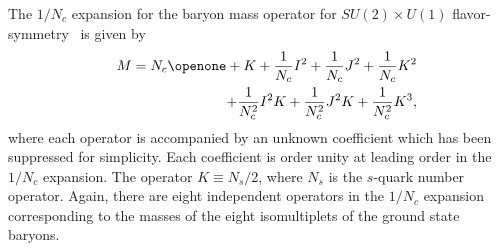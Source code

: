 \documentclass[twocolumn,nofootinbib,prd,aps,superscriptaddress,tightenlines]{revtex4}
\def\N{N_c}
\begin{document}
The $1/N_c$ expansion for the baryon mass operator for $SU(2) \times U(1)$ flavor-symmetry~\cite{djm1} is given by
\begin{eqnarray}\label{su2u1}
&&M = \N \openone + K + {1 \over \N} I^2 + {1 \over \N} J^2 + {1 \over \N} K^2 \nonumber\\
&&+ {1 \over \N^2} I^2 K + {1 \over \N^2} J^2 K
+ {1 \over \N^2} K^3,
\end{eqnarray}
where each operator is accompanied by an unknown coefficient which has been suppressed for simplicity.  Each coefficient is order unity at leading order in the $1/N_c$ expansion.  The operator $K \equiv N_s/2$, where $N_s$ is the $s$-quark number operator.  Again, there are eight independent operators in the $1/N_c$ expansion corresponding to the masses of the eight isomultiplets of the ground state baryons.    
 
%
\end{document}
